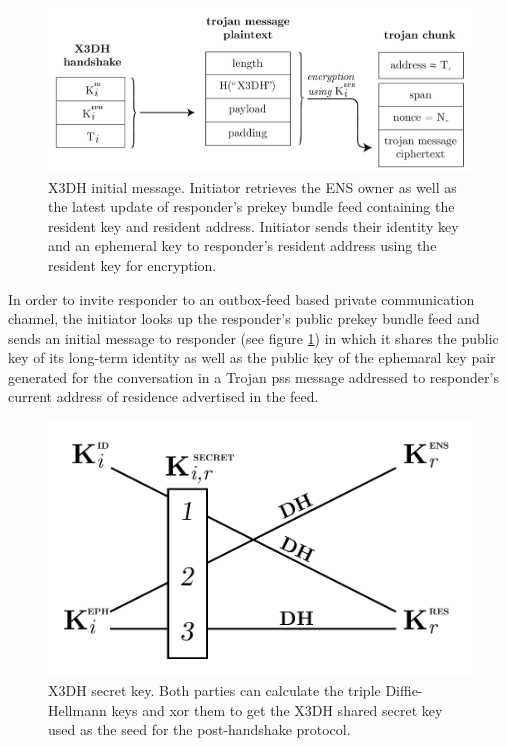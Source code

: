 \begin{figure}[htbp]
   \centering
   \includegraphics[width=.8\textwidth]{fig/x3dh-initial-message.pdf}
   \caption[X3DH initial message \statusgreen]{X3DH initial message. Initiator retrieves the ENS owner as well as the latest update of responder's prekey bundle feed containing the resident key and resident address. Initiator sends their identity key and an ephemeral key to responder's resident address using the resident key for encryption. }
\label{fig:x3dh-initial-message}
\end{figure}


In order to invite responder to an outbox-feed based private communication channel, the initiator looks up the responder's public prekey bundle feed and sends an initial message to responder (see figure \ref{fig:x3dh-initial-message}) in which it shares the public key of its long-term identity as well as the public key of the ephemaral key pair generated for the conversation in a Trojan pss message addressed to responder's current address of residence advertised in the feed. 

\begin{figure}[htbp]
   \centering
   \includegraphics[width=.6\textwidth]{fig/x3dh.pdf}
   \caption[X3DH secret key \statusgreen]{X3DH secret key. Both parties can calculate the triple Diffie-Hellmann keys and xor them to get the X3DH shared secret key used as the seed for the post-handshake protocol.}
   \label{fig:x3dh}
\end{figure}

